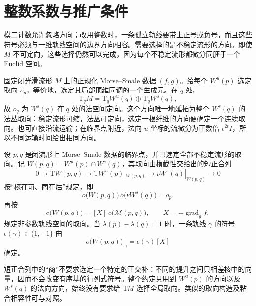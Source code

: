 
% 
% 
% 

\section{整数系数与推广条件}
\label{g2:sec:1805}

模二计数允许忽略方向；改用整数时，一条孤立轨线要带上正号或负号，而且这些符号必须与一维轨线空间的边界方向相容。需要选择的是不稳定流形的方向。即使 \(M\) 不可定向，这些选择仍然可以完成，因为每个不稳定流形都微分同胚于一个 Euclid 空间。

\ProseParagraphBreak

固定闭光滑流形 \(M\) 上的正规化 Morse--Smale 数据 \((f,g)\)。给每个 \(W^u(p)\) 选定取向 \(o_p\)，等价地，选定其局部顶维同调的一个生成元。在 \(q\) 处，
\[
	\mathrm{T}_qM=\mathrm{T}_qW^u(q)\oplus\mathrm{T}_qW^s(q),
\]
故 \(o_q\) 为 \(W^s(q)\) 在 \(q\) 处的法空间定向。这个方向唯一地延拓为整个 \(W^s(q)\) 的法丛取向：稳定流形可缩，法丛可定向，选定一根纤维的方向便确定一个连续取向。也可直接沿流运输；在临界点附近，法向 \(u\) 坐标的流微分为正数倍 \(e^{2t}I\)，所以不同运输时间给出相同方向。

\begin{definition}\label{g2:def:oriented-morse-trajectories}
	设 \(p,q\) 是闭流形上 Morse--Smale 数据的临界点，并已选定全部不稳定流形的取向。记 \(W(p,q)=W^u(p)\cap W^s(q)\)，其取向由横截性交给出的短正合列
	\[
		0\longrightarrow\mathrm{T}W(p,q)
		\longrightarrow\mathrm{T}W^u(p)|_{W(p,q)}
		\longrightarrow\nu W^s(q)|_{W(p,q)}
		\longrightarrow0
	\]
	按“核在前、商在后”规定，即
	\begin{equation}\label{g2:eq:morse-intersection-orientation}
		o\bigl(W(p,q)\bigr)\,o\bigl(\nu W^s(q)\bigr)=o_p.
	\end{equation}
	再按
	\[
		o\bigl(W(p,q)\bigr)=[X]\,o\bigl(\mathcal M(p,q)\bigr),
		\qquad X=-\operatorname{grad}_g f,
	\]
	规定非参数轨线空间的取向。当 \(\lambda(p)-\lambda(q)=1\) 时，一条轨线 \(\gamma\) 的符号 \(\epsilon(\gamma)\in\{1,-1\}\) 由
	\[
		o\bigl(W(p,q)\bigr)|_\gamma=\epsilon(\gamma)[X]
	\]
	确定。
\end{definition}

短正合列中的“商”不要求选定一个特定的正交补：不同的提升之间只相差核中的向量，因而不会改变有序基的行列式符号。整个约定只用到 \(W^u(p)\) 的方向以及 \(W^s(q)\) 的法向方向，始终没有要求给 \(\mathrm{T}M\) 选择全局取向。类似的取向构造及粘合相容性可与\cite[第3.4节，命题3.10与定理3.11]{Weber2006Morse}对照。

